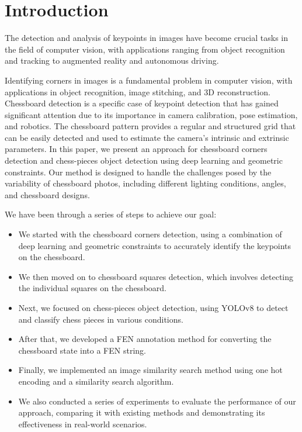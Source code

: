 \documentclass[conference]{IEEEtran}
\begin{document}
\section{Introduction}
The detection and analysis of keypoints in images have
become crucial tasks in the field of computer vision, with
applications ranging from object recognition and tracking
to augmented reality and autonomous driving.

Identifying corners in images is a fundamental
problem in computer vision, with applications in
object recognition, image stitching, and 3D reconstruction.
Chessboard detection is a specific case of keypoint detection
that has gained significant attention due to its
importance in camera calibration, pose estimation, and
robotics. The chessboard pattern provides a regular and
structured grid that can be easily detected and used to
estimate the camera's intrinsic and extrinsic parameters.
In this paper, we present an approach for chessboard corners detection
and chess-pieces object detection using deep learning
and geometric constraints. Our method is designed to
handle the challenges posed by the variability of chessboard
photos, including different lighting conditions, angles,
and chessboard designs.

We have been through a series of steps to achieve our goal:
\begin{itemize}
    \item We started with the chessboard corners detection, using a combination of deep learning and geometric constraints to accurately identify the keypoints on the chessboard.
    \item We then moved on to chessboard squares detection, which involves detecting the individual squares on the chessboard.
    \item Next, we focused on chess-pieces object detection, using YOLOv8 to detect and classify chess pieces in various conditions.
    \item After that, we developed a FEN annotation method for converting the chessboard state into a FEN string.
    \item Finally, we implemented an image similarity search method using one hot encoding and a similarity search algorithm.
    \item We also conducted a series of experiments to evaluate the performance of our approach, comparing it with existing methods and demonstrating its effectiveness in real-world scenarios.
\end{itemize}
\end{document}
